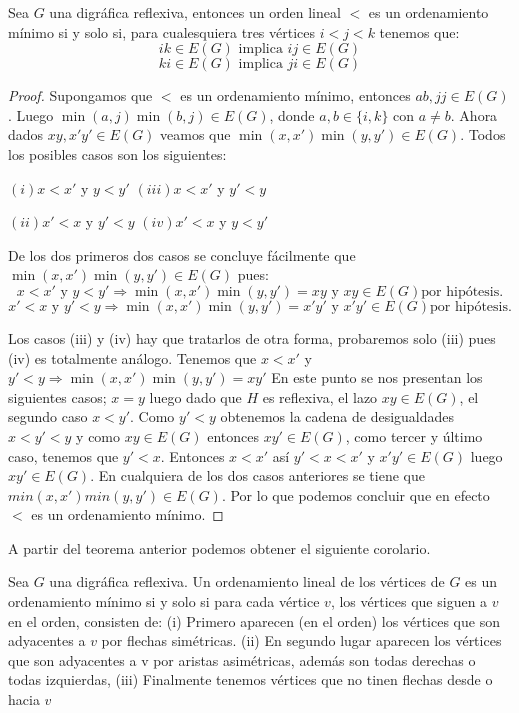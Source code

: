 \begin{teorema}
\label{teo:OrdLnl}
    Sea $G$ una digr\'afica reflexiva, entonces un orden lineal $<$ es un
    ordenamiento m\'inimo si y solo si, para cualesquiera tres v\'ertices
    $i<j<k$ tenemos que:
    $$ik\in E(G) \text{ implica } ij\in E(G)$$
    $$ki\in E(G) \text{ implica } ji\in E(G)$$
\end{teorema}
\begin{proof}
    Supongamos que $<$ es un ordenamiento m\'inimo, entonces $ab,jj\in E(G)$.
    Luego $\min (a,j) \min(b,j)\in E(G)$, donde $a,b \in \{ i,k\}$ con $a \neq
    b$. Ahora dados $xy, x'y' \in E(G)$ veamos que $\min(x,x') \min(y,y')\in
    E(G)$. Todos los posibles casos son los siguientes:
    
    $ (i) x<x' $ y $ y<y' $ \hspace{1cm} $(iii) x<x' $ y $ y'<y $
    
    $ (ii) x'<x $ y $ y'<y $ \hspace{1cm} $(iv) x'<x $ y $ y<y' $

    De los dos primeros dos casos se concluye f\'acilmente que $\min(x,x')
    \min(y,y')\in E(G)$ pues:
    $$x<x' \text{ y } y<y' \Rightarrow \min(x,x') \min(y,y')=xy \text{ y } xy\in
    E(G) \text{por hip\'otesis.}$$
    $$x'<x \text{ y } y'<y \Rightarrow \min(x,x') \min(y,y')=x'y' \text{ y }
    x'y'\in E(G) \text{por hip\'otesis.}$$
    
    Los casos (iii) y (iv) hay que tratarlos de otra forma, probaremos solo (iii)
    pues (iv) es totalmente an\'alogo. Tenemos que $x<x' $ y $ y'<y\Rightarrow
    \min(x,x') \min(y,y')=xy' $ En este punto se nos presentan los siguientes
    casos; $x=y$ luego dado que $H$ es reflexiva, el lazo $xy\in E(G)$, el
    segundo caso $x<y' $. Como $y'<y$ obtenemos la cadena de desigualdades
    $x<y'<y$ y como $xy\in E(G)$ entonces $xy'\in E(G)$, como tercer y último
    caso, tenemos que $y'<x$. Entonces $x<x'$ así $y'<x<x'$ y $x'y'\in E(G)$
    luego $xy'\in E(G)$. En cualquiera de los dos casos anteriores se tiene que
    $min(x,x')min(y,y')\in E(G)$. Por lo que podemos concluir que en efecto $<$
    es un ordenamiento mínimo.
\end{proof}

A partir del teorema anterior podemos obtener el siguiente corolario.

\begin{corolario}
\label{cor:Orden_Flechas}
    Sea $G$ una digr\'afica reflexiva. Un ordenamiento lineal de los v\'ertices
    de $G$ es un ordenamiento mínimo si y solo si para cada v\'ertice $v$, los
    v\'ertices que siguen a $v$ en el orden, consisten de: (i) Primero aparecen
    (en el orden) los v\'ertices que son adyacentes a $v$ por flechas
    sim\'etricas. (ii) En segundo lugar aparecen los v\'ertices que son
    adyacentes a v por aristas asim\'etricas, adem\'as son todas derechas o
    todas izquierdas, (iii) Finalmente tenemos v\'ertices que no tinen flechas
    desde o hacia $v$
\end{corolario}

